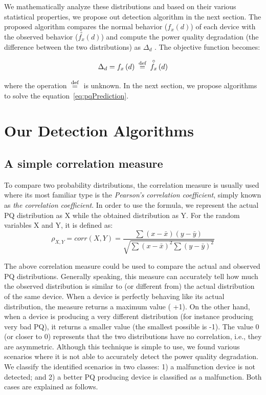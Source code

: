 We mathematically analyze these distributions and based on their various statistical properties, we propose out detection algorithm in the next section. The proposed algorithm compares the normal behavior ($f_x\left(d\right)$) of each device with the observed behavior ($\overset{\circ}{f_x}\left(d\right)$) and compute the power quality degradation (the difference between the two distributions) as $\Delta_d$ . The objective function becomes:

\begin{equation}
\label{eq:pqPrediction}
\Delta_d = f_x\left(d\right) \defeq \overset{\circ}{f_x}\left(d\right)
\end{equation}

\noindent where the operation $\defeq$ is unknown. In the next section,  we propose algorithms to solve the equation~\ref{eq:pqPrediction}.

\section{Our Detection Algorithms}
\subsection{A simple correlation measure}
To compare two probability distributions, the correlation measure is usually used where its most familiar type is the \textit{Pearson's correlation coefficient}, simply known as \textit{the correlation coefficient}. In order to use the formula, we represent the actual PQ distribution as X while the obtained distribution as Y. For the random variables X and Y, it is defined as:
\[\rho_{X,Y} = corr(X,Y) = \frac{\sum (x-\bar x) (y-\bar y)}{\sqrt{\sum (x-\bar x)^2 \sum (y-\bar y)^2}}\]

The above correlation measure could be used to compare the actual and observed PQ distributions. Generally speaking, this measure can accurately tell how much the observed distribution is similar to (or different from) the actual distribution of the same device. When a device is perfectly behaving like its actual distribution, the measure returns a maximum value (  +1). On the other hand, when a device is producing a very different distribution (for instance producing very bad PQ), it returns a smaller value (the smallest possible is -1). The value 0 (or closer to 0) represents that the two distributions have no correlation, i.e., they are asymmetric. Although this technique is simple to use, we found various scenarios where it is not able to accurately detect the power quality degradation. We classify the identified scenarios in two classes: 1) a malfunction device is not detected; and 2) a better PQ producing device is classified as a malfunction. Both cases are explained as follows.

